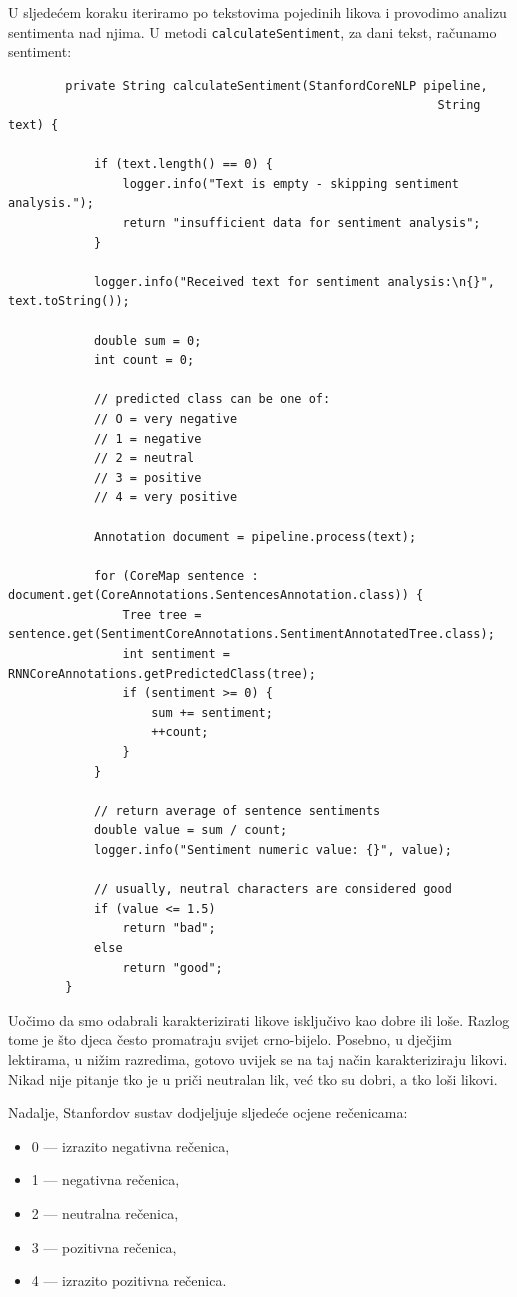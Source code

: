 \documentclass[a4paper,twoside,12pt]{memoir} %
\begin{document}
		U sljedećem koraku iteriramo po tekstovima pojedinih likova i provodimo analizu sentimenta nad njima. U metodi \texttt{calculateSentiment}, za dani tekst, ra\-ču\-na\-mo sentiment:
		\begin{lstlisting}
		private String calculateSentiment(StanfordCoreNLP pipeline,
															String text) {

			if (text.length() == 0) {
				logger.info("Text is empty - skipping sentiment analysis.");
				return "insufficient data for sentiment analysis";
			}

			logger.info("Received text for sentiment analysis:\n{}", text.toString());

			double sum = 0;
			int count = 0;

			// predicted class can be one of:
			// O = very negative
			// 1 = negative
			// 2 = neutral
			// 3 = positive
			// 4 = very positive

			Annotation document = pipeline.process(text);

			for (CoreMap sentence : document.get(CoreAnnotations.SentencesAnnotation.class)) {
				Tree tree = sentence.get(SentimentCoreAnnotations.SentimentAnnotatedTree.class);
				int sentiment = RNNCoreAnnotations.getPredictedClass(tree);
				if (sentiment >= 0) {
					sum += sentiment;
					++count;
				}
			}

			// return average of sentence sentiments
			double value = sum / count;
			logger.info("Sentiment numeric value: {}", value);

			// usually, neutral characters are considered good
			if (value <= 1.5)
				return "bad";
			else
				return "good";
		}
		\end{lstlisting}

		Uočimo da smo odabrali karakterizirati likove isključivo kao dobre ili loše. Razlog tome je što djeca često promatraju svijet crno-bijelo. Posebno, u dječjim lektirama, u nižim razredima, gotovo uvijek se na taj način karakteriziraju likovi. Nikad nije pitanje tko je u priči neutralan lik, već tko su dobri, a tko loši likovi.

		Nadalje, Stanfordov sustav dodjeljuje sljedeće ocjene rečenicama:
		\begin{itemize}
			\item	0 --- izrazito negativna rečenica,
			\item 	1 --- negativna rečenica,
			\item 	2 --- neutralna rečenica,
			\item 	3 --- pozitivna rečenica,
			\item 	4 --- izrazito pozitivna rečenica.
		\end{itemize}
\end{document}
